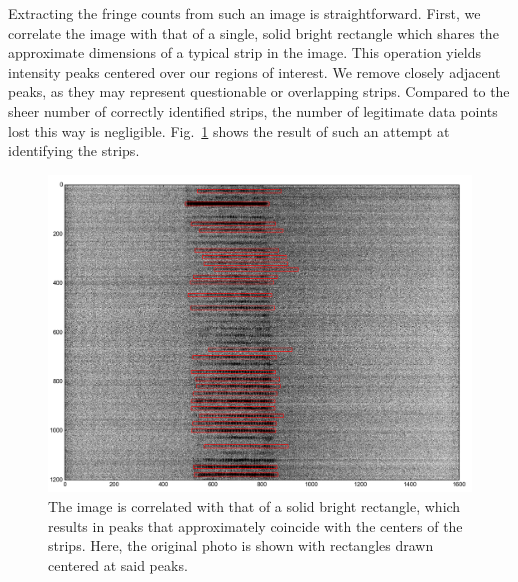 \documentclass[11.5pt]{book}
\newcommand*{\figref}[1]{Fig.~\ref{#1}}
\begin{document}
Extracting the fringe counts from such an image is straightforward. First, we
correlate the image with that of a single, solid bright rectangle which shares
the approximate dimensions of a typical strip in the image. This operation
yields intensity
peaks centered over our regions of interest. We remove closely adjacent peaks,
as they may represent questionable or overlapping strips. Compared to the sheer
number of correctly identified strips, the number of legitimate data points lost
this way is negligible. \figref{fig:globalsizing-identifystrips} shows the
result of such an attempt at identifying the strips.

\begin{figure}[h]
    \centering
    \includegraphics[height=0.38\textheight]{img/globalsizing-identifystrips.png}
    \caption{The image is correlated with that of a solid bright rectangle, which
        results in peaks that approximately coincide with the centers of the
        strips. Here, the original photo is shown with rectangles drawn centered
    at said peaks.}
    \label{fig:globalsizing-identifystrips}
\end{figure}
\end{document}
